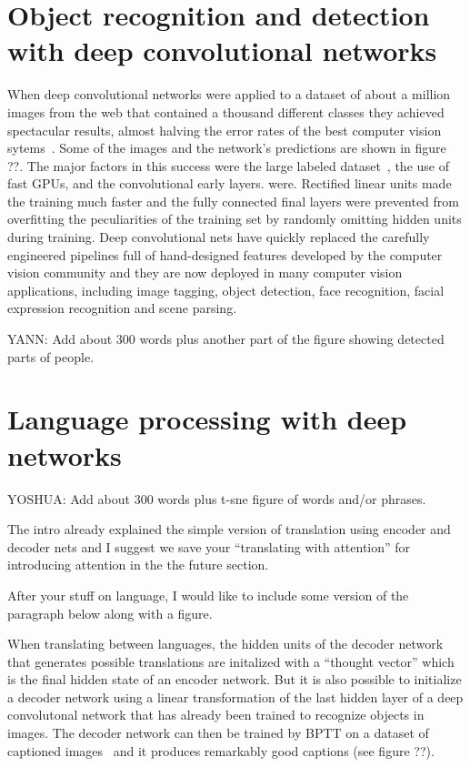 \documentclass[]{article}
\begin{document}
\section{Object recognition and detection with deep convolutional networks}

When deep convolutional networks were applied to a dataset of about a million images from the web that contained a
thousand different classes they achieved spectacular results, almost halving the error rates of the best computer vision
sytems~\cite{kriz}.  Some of the images and the network's predictions are shown in figure ??.  The major factors in this
success were the large labeled dataset~\cite{FeiFe}, the use of fast GPUs, and the convolutional early layers. were.
Rectified linear units made the training much faster and the fully connected final layers were prevented from
overfitting the peculiarities of the training set by randomly omitting hidden units during
training\cite{dropoutJMLR}. Deep convolutional nets have quickly replaced the carefully engineered pipelines full of
hand-designed features developed by the computer vision community and they are now deployed in many computer vision
applications, including image tagging, object detection, face recognition, facial expression recognition and scene parsing.

YANN: Add about 300 words plus another part of the figure showing detected parts of people. 

\section{Language processing with deep networks}

YOSHUA: Add about 300 words plus t-sne figure of words and/or phrases.   

The intro already explained the simple version of translation using encoder and decoder nets and I  suggest we  save
your ``translating with attention'' for introducing attention in the 
the future section. 

After your stuff on language, I would like to include some version of the paragraph below along with a figure.

When translating between languages, the hidden units of the decoder network that generates possible translations are
initalized with a ``thought vector'' which is the final hidden state of an encoder network.  But it is also possible to
initialize a decoder network using a linear transformation of the last hidden layer of a deep convolutonal network that
has already been trained to recognize objects in images. The decoder network can then be trained by BPTT on a dataset of
captioned images~\cite{NIC,StanfordNIC,more?} and it produces remarkably good captions (see figure ??).
\end{document}
